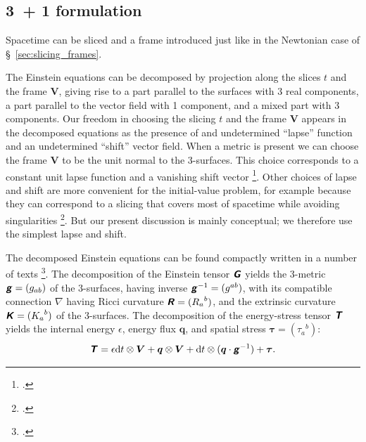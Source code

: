\documentclass[\ifafour a4paper,12pt,\else a5paper,10pt,\fi%
onecolumn,oneside,article,%
british%
]{memoir}
\theoremstyle{remark}
\theoremstyle{innote}
\newcommand*{\mathte}[1]{\textbf{\textit{\textsf{#1}}}}
\newcommand*{\citep}{\footcites}%
\newcommand*{\di}{\mathrm{d}}%
\renewcommand*{\|}{\nonscript\,\vert\nonscript\;\mathopen{}}
\newcommand*{\sect}{\S}%
\newcommand*{\chap}{ch.}%
\newcommand*{\yGG}{G}
\newcommand*{\yG}{\mathte{\yGG}}
\newcommand*{\yTT}{\tau}
\newcommand*{\yT}{\bm{\yTT}}
\newcommand*{\yTTf}{T}
\newcommand*{\yTf}{\mathte{\yTTf}}
\newcommand*{\ynn}{V}
\newcommand*{\yn}{\bm{\ynn}}
\newcommand*{\ygg}{g}
\newcommand*{\yg}{\mathte{\ygg}}
\newcommand*{\yKK}{K}
\newcommand*{\yK}{\mathte{\yKK}}
\newcommand*{\yRR}{R}
\newcommand*{\yR}{\mathte{\yRR}}
\newcommand*{\ypp}{q}
\newcommand*{\yp}{\bm{\ypp}}
\newcommand*{\ye}{\epsilon}
\newcommand*{\ynab}{\nabla}
\begin{document}
 
\subsection{3~+ 1 formulation}
\label{sec:3-1_formulation}

Spacetime can be sliced and a frame introduced just like in the Newtonian
case of \sect~\ref{sec:slicing_frames}.

The Einstein equations can be decomposed by projection along the slices $t$
and the frame $\yn$, giving rise to a part parallel to the surfaces with
3\;\texttimes{} real components, a part parallel to the vector field with
1 component, and a mixed part with 3 components. Our freedom in choosing
the slicing $t$ and the frame $\yn$ appears in the decomposed equations
as the presence of and undetermined \enquote{lapse} function and an
undetermined \enquote{shift} vector field. When a metric is present we can
choose the frame $\yn$ to be the unit normal to the 3-surfaces. This choice
corresponds to a constant unit lapse function and a vanishing shift vector
\citep{smarretal1978,smarretal1980}. Other choices of lapse and shift are
more convenient for the initial-value problem, for example because they can
correspond to a slicing that covers most of spacetime while avoiding
singularities \citep{smarretal1978}. But our present discussion is mainly
conceptual; we therefore use the simplest lapse and shift.

The decomposed Einstein equations can be found compactly written in a
number of texts
\citep[\sect~1.3]{wilsonetal2003_r2007}[\sect~4.3.2]{gourgoulhon2007_r2012}[\chap~2]{alcubierre2008}[\sect~7.2.2]{rezzollaetal2013}.
The decomposition of the Einstein tensor $\yG$ yields the 3-metric
$\yg=(\ygg_{ab})$ of the 3-surfaces, having inverse $\yg^{-1}=(\ygg^{ab})$,
with its compatible connection $\ynab$ having Ricci curvature
$\yR=({\yRR_a}^b)$, and the extrinsic curvature $\yK=({\yKK_a}^b)$ of the
3-surfaces. The decomposition of the energy-stress tensor $\yTf$ yields the
internal energy $\ye$, energy flux $\yp$, and spatial stress
$\yT=({\yTT_a}^b)$:
\begin{equation}
  \label{eq:decomp_4stress}
  \yTf = \ye \di t \otimes\yn + \yp\otimes\yn + \di t
  \otimes(\yp\cdot\yg^{-1}) + \yT.
\end{equation}
\end{document}
